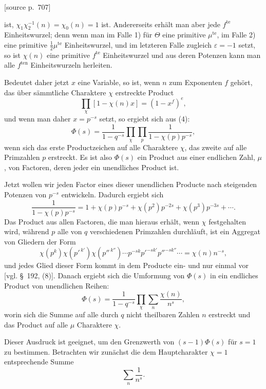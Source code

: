\documentclass[11pt]{article}
\newcommand{\srcpage}[1]{\par\medskip\noindent\textsf{[source p.~#1]}\par\smallskip}
\begin{document}
\srcpage{707}
ist, $\chi_1\chi_2^{-1}(n)=\chi_0(n)=1$ ist. Andererseits erhält man aber jede $f^{\mathrm{te}}$ Einheitswurzel; denn wenn man im Falle 1) für $\Theta$ eine primitive $\mu^{\mathrm{te}}$, im Falle 2) eine primitive $\frac12\mu^{\mathrm{te}}$ Einheitswurzel, und im letzteren Falle zugleich $\varepsilon=-1$ setzt, so ist $\chi(n)$ eine primitive $f^{\mathrm{te}}$ Einheitswurzel und aus deren Potenzen kann man alle $f^{\mathrm{ten}}$ Einheitswurzeln herleiten.

Bedeutet daher jetzt $x$ eine Variable, so ist, wenn $n$ zum Exponenten $f$ gehört, das über sämmtliche Charaktere $\chi$ erstreckte Product
\begin{equation}
\prod_\chi[1-\chi(n)x]=(1-x^f)^e,
\tag{9}
\end{equation}
und wenn man daher $x=p^{-s}$ setzt, so ergiebt sich aus (4):
\begin{equation}
\Phi(s)=\frac1{1-q^{-s}}\prod_\chi\prod_p\frac1{1-\chi(p)p^{-s}},
\tag{10}
\end{equation}
wenn sich das erste Productzeichen auf alle Charaktere $\chi$, das zweite auf alle Primzahlen $p$ erstreckt. Es ist also $\Phi(s)$ ein Product aus einer endlichen Zahl, $\mu$, von Factoren, deren jeder ein unendliches Product ist.

Jetzt wollen wir jeden Factor eines dieser unendlichen Producte nach steigenden Potenzen von $p^{-s}$ entwickeln. Dadurch ergiebt sich
\[
\frac1{1-\chi(p)p^{-s}}
=1+\chi(p)p^{-s}+\chi(p^2)p^{-2s}+\chi(p^3)p^{-3s}+\cdots .
\]
Das Product aus allen Factoren, die man hieraus erhält, wenn $\chi$ festgehalten wird, während $p$ alle von $q$ verschiedenen Primzahlen durchläuft, ist ein Aggregat von Gliedern der Form
\[
\chi(p^k)\chi(p'^{\,k'})\chi(p''^{\,k''})\cdots p^{-sk}p'^{-sk'}p''^{-sk''}\cdots
=\chi(n)n^{-s},
\]
und jedes Glied dieser Form kommt in dem Producte ein- und nur einmal vor [vgl. \S~192, (8)]. Danach ergiebt sich die Umformung von $\Phi(s)$ in ein endliches Product von unendlichen Reihen:
\begin{equation}
\Phi(s)=\frac1{1-q^{-s}}\prod_\chi\sum_n\frac{\chi(n)}{n^s},
\tag{11}
\end{equation}
worin sich die Summe auf alle durch $q$ nicht theilbaren Zahlen $n$ erstreckt und das Product auf alle $\mu$ Charaktere $\chi$.

Dieser Ausdruck ist geeignet, um den Grenzwerth von $(s-1)\Phi(s)$ für $s=1$ zu bestimmen. Betrachten wir zunächst die dem Hauptcharakter $\chi=1$ entsprechende Summe
\[
\sum_n\frac1{n^s}.
\]
\end{document}
